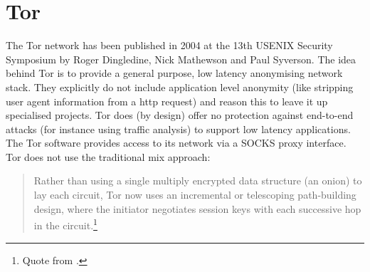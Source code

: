 \section{Tor}
The Tor network has been published in 2004
at the 13th USENIX Security Symposium by Roger Dingledine, 
Nick Mathewson and Paul Syverson.\cite{tor}
The idea behind Tor is to provide a general purpose, 
low latency anonymising network stack.
They explicitly do not include application level anonymity
(like stripping user agent information from a http request) and
reason this to leave it up specialised projects.
Tor does (by design) offer no protection against end-to-end attacks
(for instance using traffic analysis) to support low latency applications.
The Tor software provides access to its network via
a SOCKS proxy interface.
Tor does not use the traditional mix approach:
\begin{quote}
Rather than using a single multiply encrypted
data structure (an onion) to lay each circuit, Tor now uses an
incremental or telescoping path-building design, where the
initiator negotiates session keys with each successive hop in
the circuit.\footnote{Quote from \cite{tor}.}
\end{quote}





